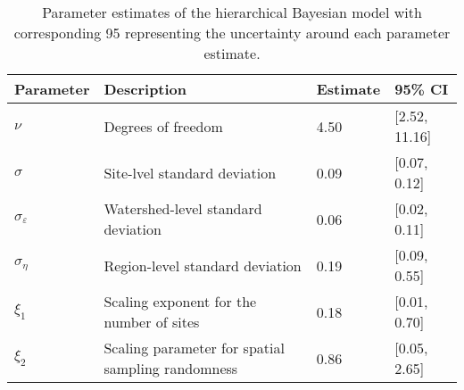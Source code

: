 \begin{table}[ht]
\centering
\caption{Parameter estimates of the hierarchical Bayesian model 
             with corresponding 95%
             representing the uncertainty around each parameter estimate.
             \label{tab:parms-est}} 
\begingroup\small
\begin{tabularx}{\textwidth}{llll}
  \hline
Parameter & Description & Estimate & 95\% CI \\ 
  \hline
$\nu$ & Degrees of freedom & 4.50 & [2.52, 11.16] \\ 
  $\sigma$ & Site-lvel standard deviation & 0.09 & [0.07, 0.12] \\ 
  $\sigma_{\varepsilon}$ & Watershed-level standard deviation & 0.06 & [0.02, 0.11] \\ 
  $\sigma_{\eta}$ & Region-level standard deviation & 0.19 & [0.09, 0.55] \\ 
  $\xi_{1}$ & Scaling exponent for the number of sites & 0.18 & [0.01, 0.70] \\ 
  $\xi_{2}$ & Scaling parameter for spatial sampling randomness & 0.86 & [0.05, 2.65] \\ 
   \hline
\end{tabularx}
\endgroup
\end{table}
